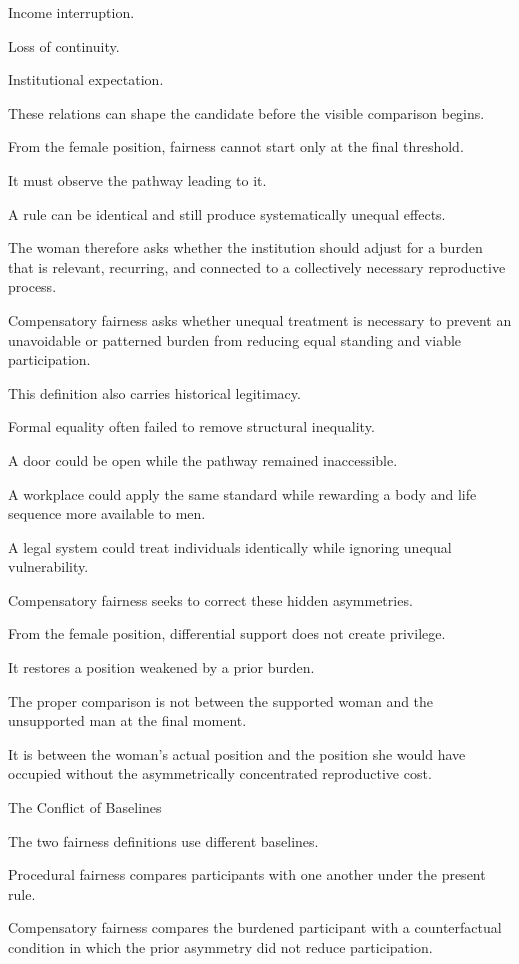 Income interruption.

Loss of continuity.

Institutional expectation.

These relations can shape the candidate before the visible comparison begins.

From the female position, fairness cannot start only at the final threshold.

It must observe the pathway leading to it.

A rule can be identical and still produce systematically unequal effects.

The woman therefore asks whether the institution should adjust for a burden that is relevant, recurring, and connected to a collectively necessary reproductive process.

Compensatory fairness asks whether unequal treatment is necessary to prevent an unavoidable or patterned burden from reducing equal standing and viable participation.

This definition also carries historical legitimacy.

Formal equality often failed to remove structural inequality.

A door could be open while the pathway remained inaccessible.

A workplace could apply the same standard while rewarding a body and life sequence more available to men.

A legal system could treat individuals identically while ignoring unequal vulnerability.

Compensatory fairness seeks to correct these hidden asymmetries.

From the female position, differential support does not create privilege.

It restores a position weakened by a prior burden.

The proper comparison is not between the supported woman and the unsupported man at the final moment.

It is between the woman’s actual position and the position she would have occupied without the asymmetrically concentrated reproductive cost.

The Conflict of Baselines

The two fairness definitions use different baselines.

Procedural fairness compares participants with one another under the present rule.

Compensatory fairness compares the burdened participant with a counterfactual condition in which the prior asymmetry did not reduce participation.

